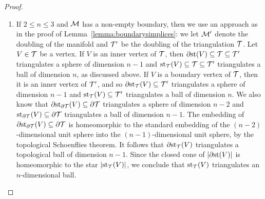 \documentclass[10pt,a4paper]{article}
\begin{document}
\begin{proof}
\begin{enumerate}
    \item 
    If $2 \leq n \leq 3$ and ${\mathcal M}$ has a non-empty boundary, then we use an approach as in the proof of Lemma~\ref{lemma:boundarysimplices}: 
    we let ${\mathcal M}'$ denote the doubling of the manifold and ${\mathcal T}'$ be the doubling of the triangulation ${\mathcal T}$. 
    Let $V \in {\mathcal T}$ be a vertex. 
    If $V$ is an inner vertex of ${\mathcal T}$, then ${\partial \rm st}(V) \subseteq {\mathcal T} \subseteq {\mathcal T}'$ triangulates a sphere of dimension $n-1$ and $\operatorname{st}_{{\mathcal T}}(V) \subseteq {\mathcal T} \subseteq {\mathcal T}'$ triangulates a ball of dimension $n$, as discussed above. 
    If $V$ is a boundary vertex of ${\mathcal T}$, then it is an inner vertex of ${\mathcal T}'$,
    and so ${\partial \rm st}_{{\mathcal T}}(V) \subseteq {\mathcal T}'$ triangulates a sphere of dimension $n-1$ and $\operatorname{st}_{{\mathcal T}}(V) \subseteq {\mathcal T}'$ triangulates a ball of dimension $n$.
    We also know that ${\partial \rm st}_{\partial{\mathcal T}}(V) \subseteq \partial{\mathcal T}$ triangulates a sphere of dimension $n-2$ and $\operatorname{st}_{\partial{\mathcal T}}(V) \subseteq \partial{\mathcal T}$ triangulates a ball of dimension $n-1$. 
    The embedding of ${\partial \rm st}_{\partial{\mathcal T}}(V) \subseteq \partial{\mathcal T}$ is homeomorphic to the standard embedding of the $(n-2)$-dimensional unit sphere into the $(n-1)$-dimensional unit sphere,
    by the topological Schoenflies theorem. 
    It follows that ${\partial \rm st}_{{\mathcal T}}(V)$ triangulates a topological ball of dimension $n-1$.
    Since the closed cone of $\left| {\partial \rm st}(V) \right|$ is homeomorphic to the star $\left| \operatorname{st}_{{\mathcal T}}(V) \right|$, we conclude that $\operatorname{st}_{{\mathcal T}}(V)$ triangulates an $n$-dimensional ball. 
    

\end{enumerate}
\end{proof}
\end{document}
